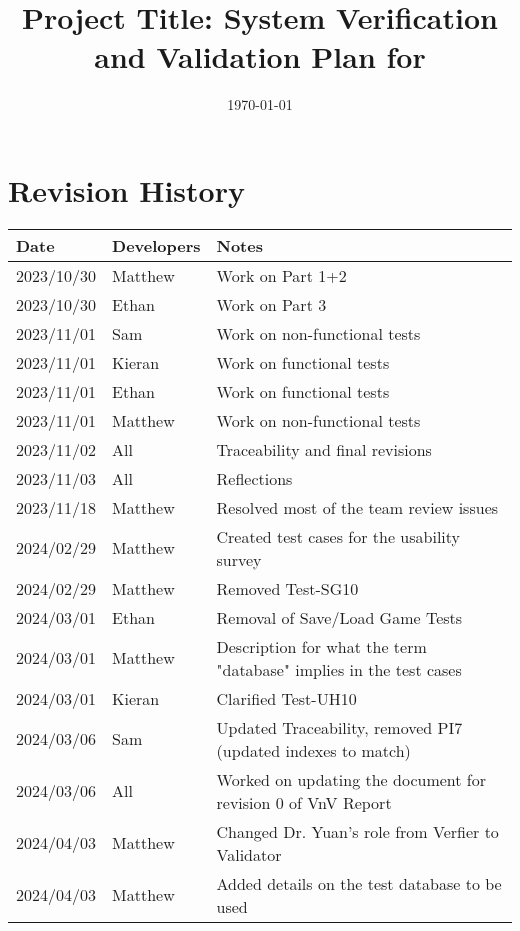 \documentclass[12pt, titlepage]{article}
\begin{document}
\title{Project Title: System Verification and Validation Plan for \progname{}} 
\author{\authname}
\date{\today}
	
\maketitle


\section*{Revision History}

\begin{tabularx}{\textwidth}{p{3cm}p{2cm}X}
\toprule {\bf Date} & {\bf Developers} & {\bf Notes}\\
\midrule
2023/10/30 & Matthew & Work on Part 1+2\\
2023/10/30 & Ethan & Work on Part 3\\
2023/11/01 & Sam & Work on non-functional tests\\
2023/11/01 & Kieran & Work on functional tests\\
2023/11/01 & Ethan & Work on functional tests\\
2023/11/01 & Matthew & Work on non-functional tests\\
2023/11/02 & All & Traceability and final revisions\\
2023/11/03 & All & Reflections\\
2023/11/18 & Matthew & Resolved most of the team review issues\\
2024/02/29 & Matthew & Created test cases for the usability survey\\
2024/02/29 & Matthew & Removed Test-SG10\\
2024/03/01 & Ethan & Removal of Save/Load Game Tests\\
2024/03/01 & Matthew & Description for what the term "database" implies in the test cases\\
2024/03/01 & Kieran & Clarified Test-UH10\\
2024/03/06 & Sam & Updated Traceability, removed PI7 (updated indexes to match)\\
2024/03/06 & All & Worked on updating the document for revision 0 of VnV Report\\
2024/04/03 & Matthew & Changed Dr. Yuan's role from Verfier to Validator\\
2024/04/03 & Matthew & Added details on the test database to be used\\

\end{tabularx}
\end{document}
